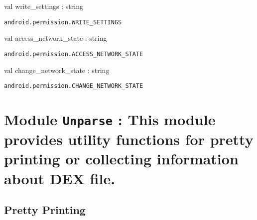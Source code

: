\documentclass[11pt]{article}
\begin{document}
\begin{ocamldocsigend}
\begin{ocamldocdescription}
\end{ocamldocdescription}


\label{val:Android.Permission.write-underscoresettings}\begin{ocamldoccode}
val write_settings : string
\end{ocamldoccode}
\begin{ocamldocdescription}
{\tt{android.permission.WRITE\_SETTINGS}}


\end{ocamldocdescription}


\label{val:Android.Permission.access-underscorenetwork-underscorestate}\begin{ocamldoccode}
val access_network_state : string
\end{ocamldoccode}
\begin{ocamldocdescription}
{\tt{android.permission.ACCESS\_NETWORK\_STATE}}


\end{ocamldocdescription}


\label{val:Android.Permission.change-underscorenetwork-underscorestate}\begin{ocamldoccode}
val change_network_state : string
\end{ocamldoccode}
\begin{ocamldocdescription}
{\tt{android.permission.CHANGE\_NETWORK\_STATE}}


\end{ocamldocdescription}
\end{ocamldocsigend}




\section{Module {\tt{Unparse}} : This module provides utility functions for pretty printing
 or collecting information about DEX file.}
\label{module:Unparse}




\ocamldocvspace{0.5cm}



\subsection{Pretty Printing}
\end{document}
